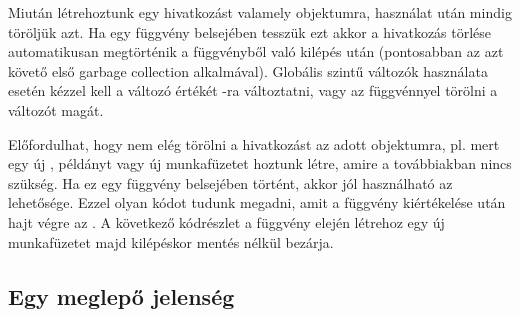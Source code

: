 Miután létrehoztunk egy hivatkozást valamely  objektumra, használat
után mindig töröljük azt. Ha egy függvény belsejében tesszük ezt akkor
a hivatkozás törlése automatikusan 
megtörténik a függvényből való kilépés után (pontosabban az azt követő
 első garbage collection alkalmával). 
Globális szintű változók használata esetén kézzel kell a változó
értékét -ra változtatni, vagy 
az  függvénnyel törölni a változót magát.
Előfordulhat, hogy nem elég törölni a hivatkozást az adott objektumra,
pl. mert egy új ,  példányt vagy új
munkafüzetet hoztunk létre, amire a továbbiakban nincs 
szükség. Ha ez egy függvény belsejében történt, akkor jól használható
az   lehetősége. Ezzel olyan kódot tudunk megadni, amit
a függvény kiértékelése után hajt végre az 
. A következő kódrészlet a függvény elején létrehoz egy új
munkafüzetet majd kilépéskor 
mentés nélkül bezárja.

\subsection{Egy meglepő jelenség}

